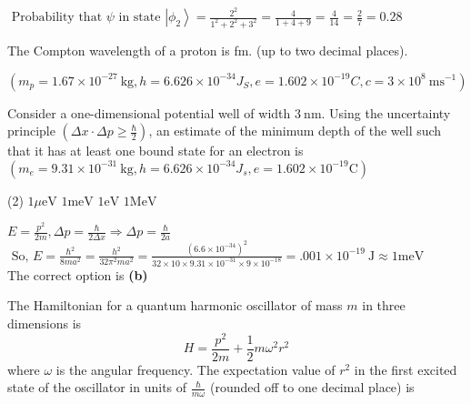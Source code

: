 \begin{enumerate}
\begin{minipage}{\textwidth}
	\end{minipage}
	\begin{answer}
		$\text { Probability that } \psi \text { in state }\left|\phi_{2}\right\rangle=\frac{2^{2}}{1^{2}+2^{2}+3^{2}}=\frac{4}{1+4+9}=\frac{4}{14}=\frac{2}{7}=0.28$
	\end{answer}
	\begin{minipage}{\textwidth}
		\item The Compton wavelength of a proton is fm. (up to two decimal places).
	\end{minipage}
	\begin{answer}
		$\left(m_{p}=1.67 \times 10^{-27} \mathrm{~kg}, h=6.626 \times 10^{-34} J_{S}, e=1.602 \times 10^{-19} C, c=3 \times 10^{8} \mathrm{~ms}^{-1}\right)$
	\end{answer}
	\begin{minipage}{\textwidth}
		\item Consider a one-dimensional potential well of width $3 \mathrm{~nm}$. Using the uncertainty principle $\left(\Delta x \cdot \Delta p \geq \frac{\hbar}{2}\right)$, an estimate of the minimum depth of the well such that it has at least one bound state for an electron is $\left(m_{e}=9.31 \times 10^{-31} \mathrm{~kg}, h=6.626 \times 10^{-34} J_{s}, e=1.602 \times 10^{-19} \mathrm{C}\right)$
	\end{minipage}
	\begin{tasks}(2)
		\task[\textbf{A.}] $1 \mu \mathrm{eV}$
		\task[\textbf{B.}]$1 \mathrm{meV}$
		\task[\textbf{C.}]$1 \mathrm{eV}$
		\task[\textbf{D.}]$1 \mathrm{MeV}$
	\end{tasks}
	\begin{answer}
		$E=\frac{p^{2}}{2 m}, \Delta p=\frac{\hbar}{2 \Delta x} \Rightarrow \Delta p=\frac{\hbar}{2 a}$\\
		$\text { So, } E=\frac{\hbar^{2}}{8 m a^{2}}=\frac{h^{2}}{32 \pi^{2} m a^{2}}=\frac{\left(6.6 \times 10^{-34}\right)^{2}}{32 \times 10 \times 9.31 \times 10^{-31} \times 9 \times 10^{-18}}=.001 \times 10^{-19} \mathrm{~J} \approx 1 \mathrm{meV}$\\
		The correct option is \textbf{(b)}
	\end{answer}
	\begin{minipage}{\textwidth}
		\item The Hamiltonian for a quantum harmonic oscillator of mass $m$ in three dimensions is
		$$
		H=\frac{p^{2}}{2 m}+\frac{1}{2} m \omega^{2} r^{2}
		$$
		where $\omega$ is the angular frequency. The expectation value of $r^{2}$ in the first excited state of the oscillator in units of $\frac{\hbar}{m \omega}$ (rounded off to one decimal place) is

\end{minipage}
\end{enumerate}
